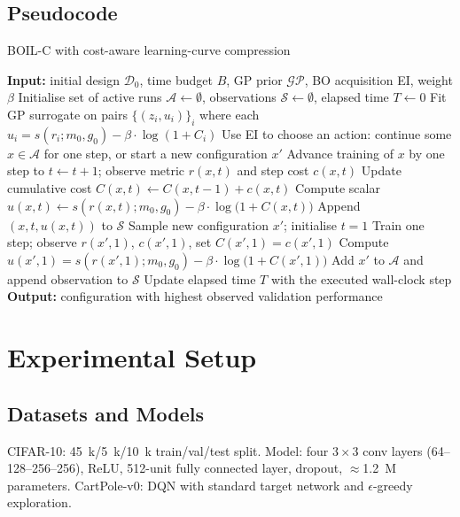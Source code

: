 \documentclass{article} %
\begin{document}
\subsection{Pseudocode}
\begin{algorithm}
\caption{BOIL-C with cost-aware learning-curve compression}
\begin{algorithmic}
  \State \textbf{Input:} initial design \(\mathcal{D}_0\), time budget \(B\), GP prior \(\mathcal{GP}\), BO acquisition EI, weight \(\beta\)
  \State Initialise set of active runs \(\mathcal{A} \leftarrow \emptyset\), observations \(\mathcal{S} \leftarrow \emptyset\), elapsed time \(T \leftarrow 0\)
    \State Fit GP surrogate on pairs \(\{(z_i, u_i)\}_{i}\) where each \(u_i = s(r_i; m_0, g_0) - \beta\cdot \log{(1 + C_i)}\)
    \State Use EI to choose an action: continue some \(x \in \mathcal{A}\) for one step, or start a new configuration \(x'\)
      \State Advance training of \(x\) by one step to \(t \leftarrow t+1\); observe metric \(r(x,t)\) and step cost \(c(x,t)\)
      \State Update cumulative cost \(C(x,t) \leftarrow C(x,t-1) + c(x,t)\)
      \State Compute scalar \(u(x,t) \leftarrow s(r(x,t); m_0, g_0) - \beta\cdot \log\big(1 + C(x,t)\big)\)
      \State Append \((x,t,u(x,t))\) to \(\mathcal{S}\)
    \Else
      \State Sample new configuration \(x'\); initialise \(t=1\)
      \State Train one step; observe \(r(x',1)\), \(c(x',1)\), set \(C(x',1)=c(x',1)\)
      \State Compute \(u(x',1) = s(r(x',1); m_0, g_0) - \beta\cdot \log\big(1 + C(x',1)\big)\)
      \State Add \(x'\) to \(\mathcal{A}\) and append observation to \(\mathcal{S}\)
    \EndIf
    \State Update elapsed time \(T\) with the executed wall-clock step
  \EndWhile
  \State \textbf{Output:} configuration with highest observed validation performance
\end{algorithmic}
\end{algorithm}

\section{Experimental Setup}
\label{sec:experimental}%
%
\subsection{Datasets and Models}
CIFAR-10: 45~k/5~k/10~k train/val/test split. Model: four \(3\times 3\) conv layers (64--128--256--256), ReLU, 512-unit fully connected layer, dropout, \(\approx\)1.2~M parameters. CartPole-v0: DQN with standard target network and \(\epsilon\)-greedy exploration.
\end{document}
